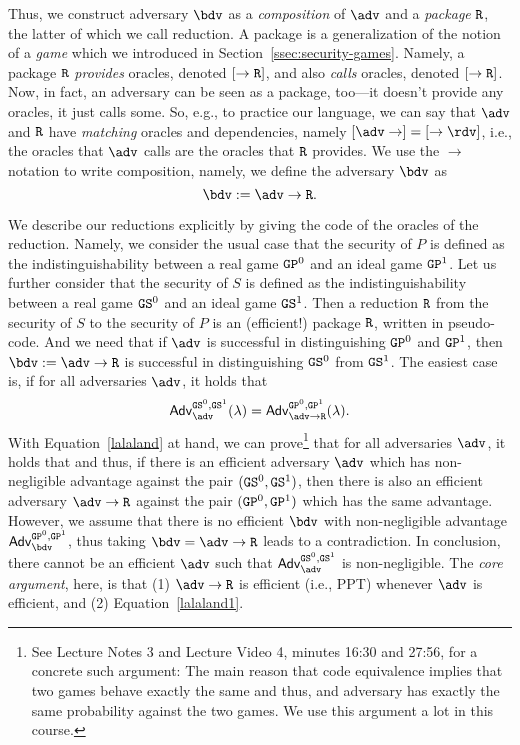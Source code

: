 Thus, we construct adversary $\bdv$ as a \emph{composition} of $\adv$ and a \emph{package} $\text{\texttt{R}}$, the latter of which we call reduction. A package is a generalization of the notion of a \emph{game} which we introduced in Section~\ref{ssec:security-games}. Namely, a package $\text{\texttt{R}}$ \emph{provides} oracles, denoted $[\rightarrow\text{\texttt{R}}]$, and also \emph{calls} oracles, denoted $[\rightarrow\text{\texttt{R}}]$. Now, in fact, an adversary can be seen as a package, too---it doesn't provide any oracles, it just calls some. So, e.g., to practice our language, we can say that $\adv$ and $\text{\texttt{R}}$ have \emph{matching} oracles and dependencies, namely $[\adv\rightarrow]=[\rightarrow\rdv]$, i.e., the oracles that $\adv$ calls are the oracles that $\text{\texttt{R}}$ provides. We use the $\rightarrow$ notation to write composition, namely, we define the adversary $\bdv$ as
\[\bdv:=\adv\rightarrow\M{R}.\]

We describe our reductions explicitly by giving the code of the oracles of the reduction. Namely, we consider the usual case that the security of $P$ is defined as the indistinguishability between a real game $\text{\texttt{GP}}^0$
and an ideal game $\text{\texttt{GP}}^1$. Let us further consider that the security of $S$ is defined as the indistinguishability between
a real game $\text{\texttt{GS}}^0$ and an ideal game $\text{\texttt{GS}}^1$. Then a reduction $\text{\texttt{R}}$ from the security of $S$ to the security of $P$
is an (efficient!) package $\text{\texttt{R}}$, written in pseudo-code. And we need that if $\adv$ is successful in distinguishing $\text{\texttt{GP}}^0$ and 
$\text{\texttt{GP}}^1$, then $\bdv:=\adv\rightarrow\M{R}$ is successful in distinguishing $\text{\texttt{GS}}^0$ from $\text{\texttt{GS}}^1$. The easiest case is,
if for all adversaries $\adv$, it holds that
\begin{equation}\label{lalaland1}
\mathsf{Adv}^{\M{GS}^0,\M{GS}^1}_\adv(\lambda)=\mathsf{Adv}^{\M{GP}^0,\M{GP}^1}_{\adv\rightarrow\M{R}}(\lambda).
\end{equation}
With Equation~\ref{lalaland} at hand, we can prove\footnote{See Lecture Notes 3 and Lecture Video 4, minutes 16:30 and 27:56, for a concrete such argument: The main reason that code equivalence implies that two games behave exactly the same and thus, and adversary has exactly the same probability against the two games. We use this argument a lot in this course.}  that for all adversaries $\adv$, it holds that 
and thus, if there is an efficient adversary $\adv$ which has non-negligible advantage against the pair $(\text{\texttt{GS}}^0,\text{\texttt{GS}}^1)$,
then there is also an efficient adversary $\adv\rightarrow\M{R}$ against the pair $(\text{\texttt{GP}}^0,\text{\texttt{GP}}^1)$ which has the same
advantage. However, we assume that there is no efficient $\bdv$ with non-negligible advantage $\mathsf{Adv}^{\M{GP}^0,\M{GP}^1}_{\bdv}$, thus taking $\bdv=\adv\rightarrow\M{R}$ leads to a contradiction. In conclusion, there cannot be an efficient $\adv$ such that $\mathsf{Adv}^{\M{GS}^0,\M{GS}^1}_\adv$ is non-negligible. The \emph{core argument}, here, is that (1) $\adv\rightarrow\M{R}$ is efficient (i.e., PPT) whenever $\adv$ is efficient, and (2) Equation~\ref{lalaland1}.

